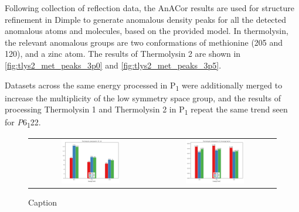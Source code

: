 Following collection of reflection data, the AnACor results are used for structure refinement in Dimple to generate anomalous density peaks for all the detected anomalous atoms and molecules, based on the provided model. In thermolysin, the relevant anomalous groups are two conformations of methionine (205 and 120), and a zinc atom. The results of Thermolysin 2 are shown in \cref{fig:tlys2_met_peaks_3p0} and \cref{fig:tlys2_met_peaks_3p5}.

Datasets across the same energy processed in P\textsubscript{1} were additionally merged to increase the multiplicity of the low symmetry space group, and the results of processing Thermolysin 1 and Thermolysin 2 in P\textsubscript{1} repeat the same trend seen for \textit{P}6\textsubscript{1}22.

\begin{figure}[h]
    \centering
    \begin{tabular}{cc}
    \includegraphics[width = 0.5\textwidth]{plots/exp1/tlys_9_P1/I_over_sigma.png} & \includegraphics[width = 0.5\textwidth]{plots/exp1/tlys_9_P1/rmerges.png}
    \end{tabular}
    \caption{Caption}
    \label{fig:tlys_2_p6}
\end{figure}

